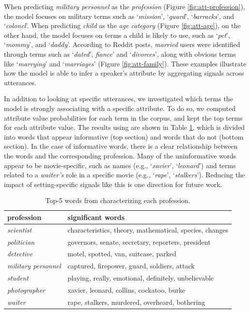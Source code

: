 When predicting \textit{military personnel} as the \textit{profession} (Figure \ref{fig:att-profession}), the model focuses on military terms such as `\textit{mission}', `\textit{guard}', `\textit{barracks}', and `\textit{colonel}'.
When predicting \textit{child} as the \textit{age category} (Figure \ref{fig:att-age}), on the other hand, the model focuses on terms a child is likely to use, such as `\textit{pet}', `\textit{mommy}', and `\textit{daddy}'.
According to Reddit posts,  \textit{married} users were identified through terms such as `\textit{dated}', \textit{fiance}' and `\textit{divorces}', along with obvious terms like `\textit{marrying}' and `\textit{marriages}' (Figure \ref{fig:att-family}). 
These examples illustrate how the model is able to infer a speaker's attribute by aggregating signals across utterances.

In addition to looking at specific utterances, we investigated which terms the model is strongly associating with a specific attribute. To do so, we computed attribute value probabilities for each term in the corpus, and kept the top terms for each attribute value. The results using  are shown in Table \ref{tab6}, which is divided into words that appear informative (top section) and words that do not (bottom section). In the case of informative words, there is a clear relationship between the words and the corresponding profession. 
Many of the uninformative words appear to be movie-specific, such as names (e.g., `\textit{xavier}', `\textit{leonard}') and terms related to a \textit{waiter's} role in a specific movie (e.g., `\textit{rape}', `\textit{stalkers}'). Reducing the impact of setting-specific signals like this is one direction for future work.

\begin{table}[t]
\centering
\small
\begin{adjustbox}{width=0.7\textwidth,center}
\begin{tabular}{@{}l@{\hskip 2.7\tabcolsep}l@{}}
\toprule
\textbf{profession} & \textbf{significant words} \\
\midrule
\textit{scientist} & characteristics, theory, mathematical, species, changes \\
\textit{politician} & governors, senate, secretary, reporters, president \\
\textit{detective} & motel, spotted, van, suitcase, parked \\
\textit{military personnel} & captured, firepower, guard, soldiers, attack \\
\midrule
\textit{student} & playing, really, emotional, definitely, unbelievable \\
\textit{photographer} & xavier, leonard, collins, cockatoo, burke \\
\textit{waiter} & rape, stalkers, murdered, overheard, bothering \\
\bottomrule
\end{tabular}
\end{adjustbox}
\caption{Top-5 words from  characterizing each profession.
}
\label{tab6}
\end{table}

